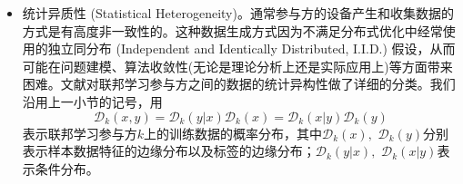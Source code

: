 \begin{itemize}
\item 统计异质性 (Statistical Heterogeneity)。通常参与方的设备产生和收集数据的方式是有高度非一致性的。这种数据生成方式因为不满足分布式优化中经常使用的独立同分布 (Independent and Identically Distributed, I.I.D.) 假设，从而可能在问题建模、算法收敛性(无论是理论分析上还是实际应用上)等方面带来困难。文献\cite{kairouz2019advances_fl}对联邦学习参与方之间的数据的统计异构性做了详细的分类。我们沿用上一小节的记号，用
\begin{equation}
\label{eq:dist_decomp}
\mathcal{D}_k(x, y) = \mathcal{D}_k(y | x) \mathcal{D}_k(x) = \mathcal{D}_k(x | y) \mathcal{D}_k(y)
\end{equation}
表示联邦学习参与方$k$上的训练数据的概率分布，其中$\mathcal{D}_k(x),$ $\mathcal{D}_k(y)$分别表示样本数据特征的边缘分布以及标签的边缘分布；$\mathcal{D}_k(y | x),$ $\mathcal{D}_k(x | y)$表示条件分布。


\end{itemize}
